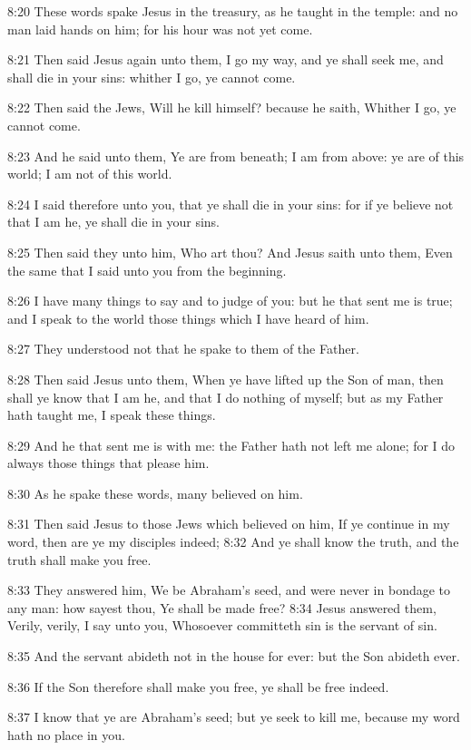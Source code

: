 8:20 These words spake Jesus in the treasury, as he taught in the temple: and no man laid hands on him; for his hour was not yet come.

8:21 Then said Jesus again unto them, I go my way, and ye shall seek me, and shall die in your sins: whither I go, ye cannot come.

8:22 Then said the Jews, Will he kill himself? because he saith, Whither I go, ye cannot come.

8:23 And he said unto them, Ye are from beneath; I am from above: ye are of this world; I am not of this world.

8:24 I said therefore unto you, that ye shall die in your sins: for if ye believe not that I am he, ye shall die in your sins.

8:25 Then said they unto him, Who art thou? And Jesus saith unto them, Even the same that I said unto you from the beginning.

8:26 I have many things to say and to judge of you: but he that sent me is true; and I speak to the world those things which I have heard of him.

8:27 They understood not that he spake to them of the Father.

8:28 Then said Jesus unto them, When ye have lifted up the Son of man, then shall ye know that I am he, and that I do nothing of myself; but as my Father hath taught me, I speak these things.

8:29 And he that sent me is with me: the Father hath not left me alone; for I do always those things that please him.

8:30 As he spake these words, many believed on him.

8:31 Then said Jesus to those Jews which believed on him, If ye continue in my word, then are ye my disciples indeed; 8:32 And ye shall know the truth, and the truth shall make you free.

8:33 They answered him, We be Abraham's seed, and were never in bondage to any man: how sayest thou, Ye shall be made free?  8:34 Jesus answered them, Verily, verily, I say unto you, Whosoever committeth sin is the servant of sin.

8:35 And the servant abideth not in the house for ever: but the Son abideth ever.

8:36 If the Son therefore shall make you free, ye shall be free indeed.

8:37 I know that ye are Abraham's seed; but ye seek to kill me, because my word hath no place in you.

